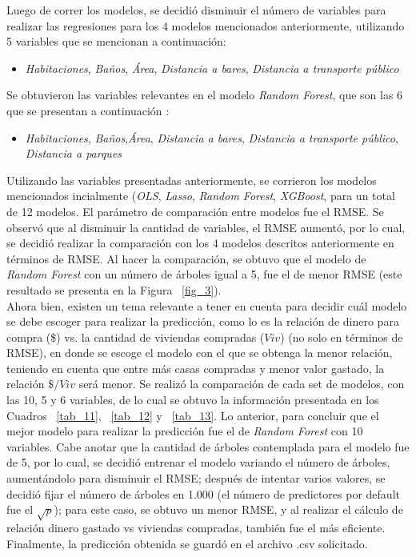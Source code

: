 \documentclass[conference, 10pt]{IEEEtran}
\begin{document}
Luego de correr los modelos, se decidió disminuir el número de variables para realizar las regresiones para los 4 modelos mencionados anteriormente, utilizando 5 variables que se mencionan a continuación: 
\begin{itemize}
\item \textit{Habitaciones}, \textit{Baños}, \textit{Área}, \textit{Distancia a bares}, \textit{Distancia a transporte público} 
\end{itemize}
Se obtuvieron las variables relevantes en el modelo \textit{Random Forest}, que son las 6 que se presentan a continuación :
\begin{itemize}
\item \textit{Habitaciones}, \textit{Baños},\textit{Área}, \textit{Distancia a bares}, \textit{Distancia a transporte público},  \textit{Distancia a parques}
\end{itemize}
Utilizando las variables presentadas anteriormente, se corrieron los modelos mencionados incialmente (\textit{OLS}, \textit{Lasso}, \textit{Random Forest}, \textit{XGBoost}, para un total de 12 modelos. El parámetro de comparación entre modelos fue el RMSE. Se observó que al disminuir la cantidad de variables, el RMSE aumentó, por lo cual, se decidió realizar la comparación con los 4 modelos descritos anteriormente en términos de RMSE. Al hacer la comparación, se obtuvo que el modelo de \textit{Random Forest} con un número de árboles igual a 5, fue el de menor RMSE (este resultado se presenta en la Figura ~\ref{fig_3}). \\
Ahora bien, existen un tema relevante a tener en cuenta para decidir cuál modelo se debe escoger para realizar la predicción, como lo es la relación de dinero para compra (\$) vs. la cantidad de viviendas compradas ($Viv$) (no solo en términos de RMSE), en donde se escoge el modelo con el que se obtenga la menor relación, teniendo en cuenta que entre más casas compradas y menor valor gastado, la relación $ \$/Viv$ será menor. Se realizó la comparación de cada set de modelos, con las 10, 5 y 6 variables, de lo cual se obtuvo la información presentada en los Cuadros ~\ref{tab_11}, ~\ref{tab_12} y ~\ref{tab_13}. Lo anterior, para concluir que el mejor modelo para realizar la predicción fue el de \textit{Random Forest} con 10 variables. Cabe anotar que la cantidad de árboles contemplada para el modelo fue de 5, por lo cual, se decidió entrenar el modelo variando el número de árboles, aumentándolo para disminuir el RMSE; después de intentar varios valores, se decidió fijar el número de árboles en 1.000 (el número de predictores por default fue el $\sqrt{p}$); para este caso, se obtuvo un menor RMSE, y al realizar el cálculo de relación dinero gastado vs viviendas compradas, también fue el más eficiente. Finalmente, la predicción obtenida se guardó en el archivo .csv solicitado.
\end{document}
